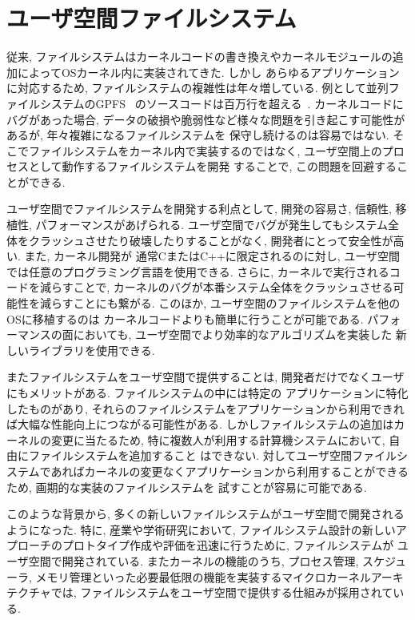 \documentclass[a4paper,11pt]{jreport}
\begin{document}
\section{ユーザ空間ファイルシステム}
従来, ファイルシステムはカーネルコードの書き換えやカーネルモジュールの追加によってOSカーネル内に実装されてきた. しかし
あらゆるアプリケーションに対応するため, ファイルシステムの複雑性は年々増している. 例として並列ファイルシステムのGPFS~\cite{270722}
のソースコードは百万行を超える~\cite{3149376}. 
カーネルコードにバグがあった場合, データの破損や脆弱性など様々な問題を引き起こす可能性があるが, 年々複雑になるファイルシステムを
保守し続けるのは容易ではない. 
そこでファイルシステムをカーネル内で実装するのではなく, ユーザ空間上のプロセスとして動作するファイルシステムを開発
することで, この問題を回避することができる. 

ユーザ空間でファイルシステムを開発する利点として, 開発の容易さ, 信頼性, 移植性, パフォーマンスがあげられる. 
ユーザ空間でバグが発生してもシステム全体をクラッシュさせたり破壊したりすることがなく, 開発者にとって安全性が高い. また, カーネル開発が
通常CまたはC++に限定されるのに対し, ユーザ空間では任意のプログラミング言語を使用できる. さらに, カーネルで実行されるコードを減らすことで, 
カーネルのバグが本番システム全体をクラッシュさせる可能性を減らすことにも繋がる. このほか, ユーザ空間のファイルシステムを他のOSに移植するのは
カーネルコードよりも簡単に行うことが可能である. パフォーマンスの面においても, ユーザ空間でより効率的なアルゴリズムを実装した
新しいライブラリを使用できる. 

またファイルシステムをユーザ空間で提供することは, 開発者だけでなくユーザにもメリットがある. ファイルシステムの中には特定の
アプリケーションに特化したものがあり, それらのファイルシステムをアプリケーションから利用できれば大幅な性能向上につながる可能性がある. 
しかしファイルシステムの追加はカーネルの変更に当たるため, 特に複数人が利用する計算機システムにおいて, 自由にファイルシステムを追加すること
はできない. 
対してユーザ空間ファイルシステムであればカーネルの変更なくアプリケーションから利用することができるため, 画期的な実装のファイルシステムを
試すことが容易に可能である. 

このような背景から, 多くの新しいファイルシステムがユーザ空間で開発されるようになった.
特に, 産業や学術研究において, ファイルシステム設計の新しいアプローチのプロトタイプ作成や評価を迅速に行うために, ファイルシステムが
ユーザ空間で開発されている. 
またカーネルの機能のうち, プロセス管理, スケジューラ, メモリ管理といった必要最低限の機能を実装するマイクロカーネルアーキテクチャでは, 
ファイルシステムをユーザ空間で提供する仕組みが採用されている. 
\end{document}
